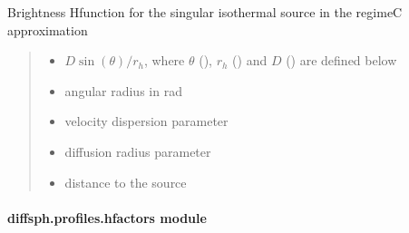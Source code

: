 \documentclass[letterpaper,10pt,english]{sphinxmanual}
\begin{document}
\begin{fulllineitems}
\label{\detokenize{diffsph.profiles:diffsph.profiles.analytics.sisbrC}}
\pysigstartsignatures
{}
\pysigstopsignatures
\sphinxAtStartPar
Brightness H\sphinxhyphen{}function for the singular isothermal  source in the regime\sphinxhyphen{}C approximation
\begin{quote}\begin{description}
\begin{itemize}
\item {} 
\sphinxAtStartPar
{} \textendash{} \(D\sin(\theta)/r_h\), where \(\theta\) (), \(r_h\) () and \(D\) () are defined below

\item {} 
\sphinxAtStartPar
{} \textendash{} angular radius in rad

\item {} 
\sphinxAtStartPar
{} \textendash{} velocity dispersion parameter

\item {} 
\sphinxAtStartPar
{} \textendash{} diffusion radius parameter

\item {} 
\sphinxAtStartPar
{} \textendash{} distance to the source

\end{itemize}

\end{description}\end{quote}

\end{fulllineitems}



\paragraph{diffsph.profiles.hfactors module}
\label{\detokenize{diffsph.profiles:module-diffsph.profiles.hfactors}}\label{\detokenize{diffsph.profiles:diffsph-profiles-hfactors-module}}
\end{document}
